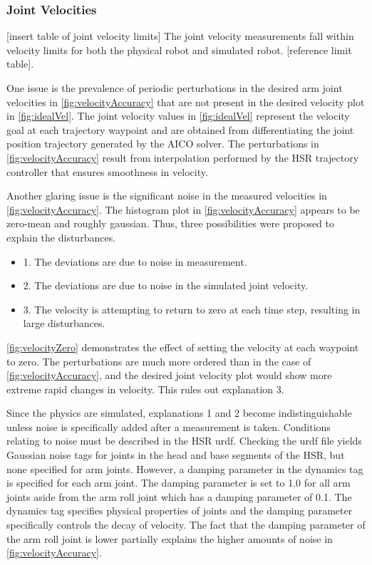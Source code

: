 \documentclass[12pt]{article}
\begin{document}
        \subsubsection{Joint Velocities}
            [insert table of joint velocity limits]
            The joint velocity measurements fall within velocity limits for both the physical robot and simulated robot. [reference limit table]. 
            \par One issue is the prevalence of periodic perturbations in the desired arm joint velocities in \cref{fig:velocityAccuracy} that are not present in the desired velocity plot in \cref{fig:idealVel}. The joint velocity values in \cref{fig:idealVel} represent the velocity goal at each trajectory waypoint and are obtained from differentiating the joint position trajectory generated by the AICO solver. The perturbations in \cref{fig:velocityAccuracy} result from interpolation performed by the HSR trajectory controller that ensures smoothness in velocity.

            \par Another glaring issue is the significant noise in the measured velocities in \cref{fig:velocityAccuracy}. The histogram plot in \cref{fig:velocityAccuracy} appears to be zero-mean and roughly gaussian. Thus, three possibilities were proposed to explain the disturbances.
            \begin{itemize}
                \item 1. The deviations are due to noise in measurement.
                \item 2. The deviations are due to noise in the simulated joint velocity.
                \item 3. The velocity is attempting to return to zero at each time step, resulting in large disturbances.
            \end{itemize}

            \cref{fig:velocityZero} demonstrates the effect of setting the velocity at each waypoint to zero. The perturbations are much more ordered than in the case of \cref{fig:velocityAccuracy}, and the desired joint velocity plot would show more extreme rapid changes in velocity. This rules out explanation 3. 

            \par Since the physics are simulated, explanations 1 and 2 become indistinguishable unless noise is specifically added after a measurement is taken. Conditions relating to noise must be described in the HSR urdf. Checking the urdf file yields Gaussian noise tags for joints in the head and base segments of the HSR, but none specified for arm joints. However, a damping parameter in the dynamics tag is specified for each arm joint. The damping parameter is set to 1.0 for all arm joints aside from the arm roll joint which has a damping parameter of 0.1. The dynamics tag specifies physical properties of joints and the damping parameter specifically controls the decay of velocity. The fact that the damping parameter of the arm roll joint is lower partially explains the higher amounts of noise in \cref{fig:velocityAccuracy}.
\end{document}
